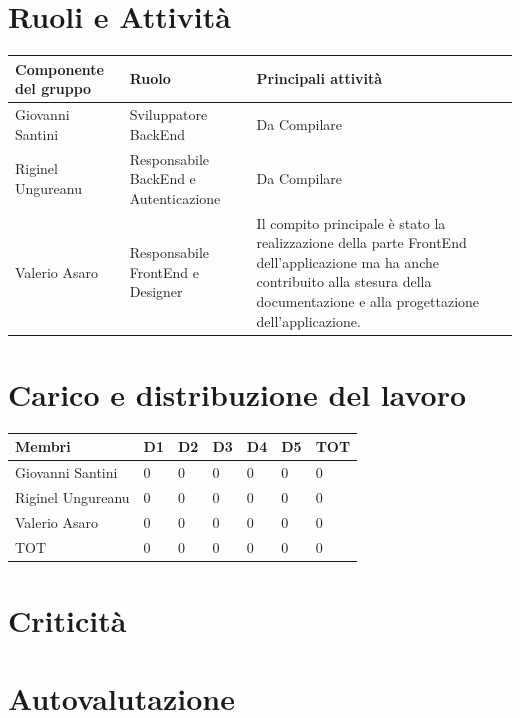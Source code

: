 \documentclass{report}
\begin{document}
\section{Ruoli e Attività}
\begin{center} %
	\centering
	\begin{tabular}{ |p{4cm}|p{4cm}|p{7cm}|  }
		\hline
		\centering Componente del gruppo & \qquad\qquad Ruolo & \qquad Principali attività \\ %
		\hline
		\centering Giovanni Santini & Sviluppatore BackEnd & Da Compilare \\
		\hline
		\centering Riginel Ungureanu & Responsabile BackEnd e Autenticazione & Da Compilare \\
		\hline
		\centering Valerio Asaro & Responsabile FrontEnd e Designer & 
		 Il compito principale è stato la realizzazione della parte FrontEnd dell'applicazione ma ha anche contribuito alla stesura della documentazione e alla progettazione dell'applicazione.  \\
		\hline
	\end{tabular}
\end{center}

\section{Carico e distribuzione del lavoro}
\begin{center} %
	\centering
	\begin{tabular}{ |p{3cm}|p{1cm}|p{1cm}|p{1cm}|p{1cm}|p{1cm}|p{1cm}|  }
		\hline
		\centering  Membri  &  D1 &  D2 & D3 & D4 & D5 & TOT\\ %
		\hline
		\centering Giovanni Santini & 0 & 0 & 0 & 0 & 0 & 0 \\
		\hline
		\centering Riginel Ungureanu & 0 & 0 & 0 & 0 & 0 & 0 \\
		\hline
		\centering Valerio Asaro & 0 & 0 & 0 & 0 & 0 & 0 \\
		\hline
		\centering TOT & 0 & 0 & 0 & 0 & 0 & 0 \\
		\hline
	\end{tabular}
\end{center}

\section{Criticità}

\section{Autovalutazione}
\end{document}
